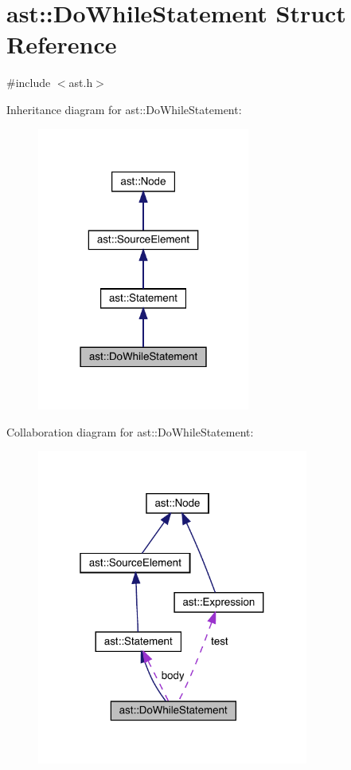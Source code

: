 \hypertarget{structast_1_1_do_while_statement}{}\section{ast\+:\+:Do\+While\+Statement Struct Reference}
\label{structast_1_1_do_while_statement}


{\ttfamily \#include $<$ast.\+h$>$}



Inheritance diagram for ast\+:\+:Do\+While\+Statement\+:\nopagebreak
\begin{figure}[H]
\begin{center}
\leavevmode
\includegraphics[width=198pt]{structast_1_1_do_while_statement__inherit__graph}
\end{center}
\end{figure}


Collaboration diagram for ast\+:\+:Do\+While\+Statement\+:\nopagebreak
\begin{figure}[H]
\begin{center}
\leavevmode
\includegraphics[width=253pt]{structast_1_1_do_while_statement__coll__graph}
\end{center}
\end{figure}
